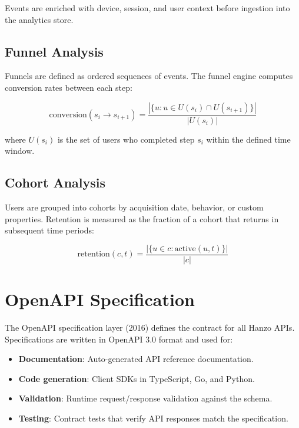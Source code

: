 \documentclass[11pt,a4paper]{article}
\begin{document}
Events are enriched with device, session, and user context before ingestion into the analytics store.

\subsection{Funnel Analysis}

Funnels are defined as ordered sequences of events. The funnel engine computes conversion rates between each step:

\begin{equation}
    \text{conversion}(s_i \to s_{i+1}) = \frac{|\{u : u \in U(s_i) \cap U(s_{i+1})\}|}{|U(s_i)|}
\end{equation}

where $U(s_i)$ is the set of users who completed step $s_i$ within the defined time window.

\subsection{Cohort Analysis}

Users are grouped into cohorts by acquisition date, behavior, or custom properties. Retention is measured as the fraction of a cohort that returns in subsequent time periods:

\begin{equation}
    \text{retention}(c, t) = \frac{|\{u \in c : \text{active}(u, t)\}|}{|c|}
\end{equation}

\section{OpenAPI Specification}

The OpenAPI specification layer (2016) defines the contract for all Hanzo APIs. Specifications are written in OpenAPI 3.0 format and used for:

\begin{itemize}
    \item \textbf{Documentation}: Auto-generated API reference documentation.
    \item \textbf{Code generation}: Client SDKs in TypeScript, Go, and Python.
    \item \textbf{Validation}: Runtime request/response validation against the schema.
    \item \textbf{Testing}: Contract tests that verify API responses match the specification.
\end{itemize}
\end{document}
